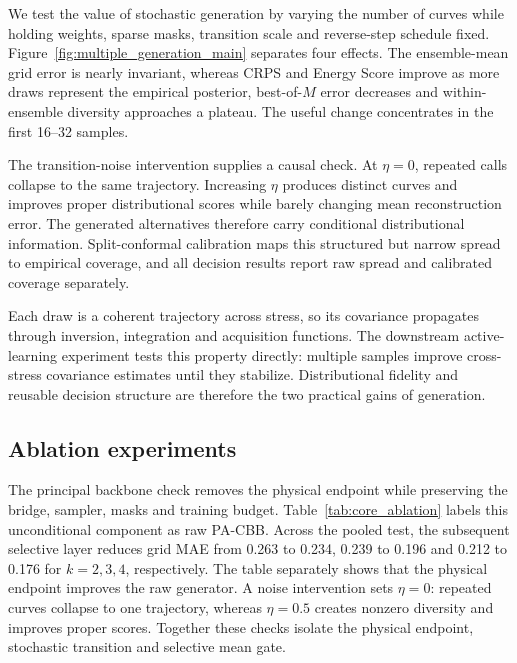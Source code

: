 \documentclass[a4paper,fleqn]{cas-dc}
\newcommand{\rawmethod}{PA-CBB}
\begin{document}
We test the value of stochastic generation by varying the number of curves while holding weights, sparse masks, transition scale and reverse-step schedule fixed. Figure~\ref{fig:multiple_generation_main} separates four effects. The ensemble-mean grid error is nearly invariant, whereas CRPS and Energy Score improve as more draws represent the empirical posterior, best-of-$M$ error decreases and within-ensemble diversity approaches a plateau. The useful change concentrates in the first 16--32 samples.

The transition-noise intervention supplies a causal check. At $\eta=0$, repeated calls collapse to the same trajectory. Increasing $\eta$ produces distinct curves and improves proper distributional scores while barely changing mean reconstruction error. The generated alternatives therefore carry conditional distributional information. Split-conformal calibration maps this structured but narrow spread to empirical coverage, and all decision results report raw spread and calibrated coverage separately.

Each draw is a coherent trajectory across stress, so its covariance propagates through inversion, integration and acquisition functions. The downstream active-learning experiment tests this property directly: multiple samples improve cross-stress covariance estimates until they stabilize. Distributional fidelity and reusable decision structure are therefore the two practical gains of generation.

\subsection{Ablation experiments}

The principal backbone check removes the physical endpoint while preserving the bridge, sampler, masks and training budget. Table~\ref{tab:core_ablation} labels this unconditional component as raw \rawmethod{}. Across the pooled test, the subsequent selective layer reduces grid MAE from 0.263 to 0.234, 0.239 to 0.196 and 0.212 to 0.176 for $k=2,3,4$, respectively. The table separately shows that the physical endpoint improves the raw generator. A noise intervention sets $\eta=0$: repeated curves collapse to one trajectory, whereas $\eta=0.5$ creates nonzero diversity and improves proper scores. Together these checks isolate the physical endpoint, stochastic transition and selective mean gate.



\iffalse
\end{document}
